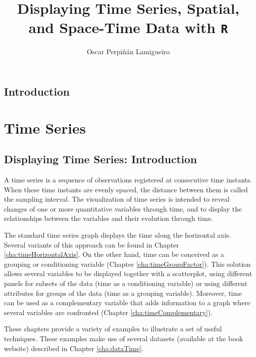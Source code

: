 \documentclass[smallroyalvopaper]{memoir}
\author{Oscar Perpiñán Lamigueiro}
\date{}
\title{Displaying Time Series, Spatial, and Space-Time Data with \texttt{R}}
\begin{document}
\maketitle
\frontmatter

\cleardoublepage

\setcounter{tocdepth}{1}
\tableofcontents

\mainmatter

\chapter{Introduction}
\label{sec:org4955747}
\label{sec:introduction}



\part{Time Series}
\label{sec:orge5e8f39}

\chapter{Displaying Time Series: Introduction}
\label{sec:orgac21d60}
\label{cha:timeIntro}

A time series is a sequence of observations registered at consecutive time instants. When these time instants are evenly spaced, the distance between them is called the sampling interval. The visualization of time series is intended to reveal changes of one or more quantitative variables through time, and to display the relationships between the variables and their evolution through time.

The standard time series graph displays the time along the horizontal axis. Several variants of this approach can be found in Chapter \ref{cha:timeHorizontalAxis}. On the other hand, time can be conceived as a grouping or conditioning variable (Chapter \ref{cha:timeGroupFactor}). This solution allows several variables to be displayed together with a scatterplot, using different panels for subsets of the data (time as a conditioning variable) or using different attributes for groups of the data (time as a grouping variable). Moreover, time can be used as a complementary variable that adds information to a graph where several variables are confronted (Chapter \ref{cha:timeComplementary}).

These chapters provide a variety of examples to illustrate a set of useful techniques. These examples make use of several datasets (available at the book website) described in Chapter \ref{cha:dataTime}.
\end{document}
